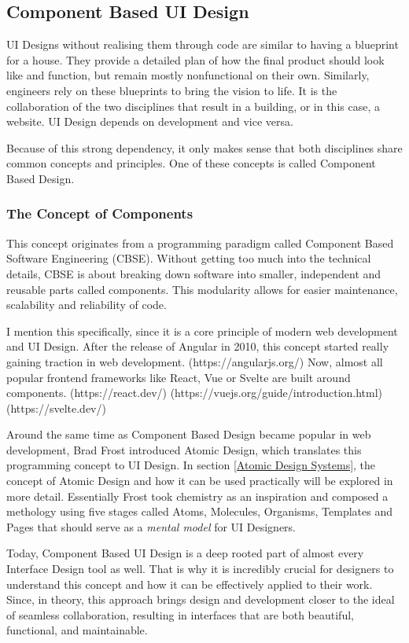 \newpage
\subsection{Component Based UI Design}
UI Designs without realising them through code are similar to having a blueprint for a house. They
provide a detailed plan of how the final product should look like and function, but remain mostly
nonfunctional on their own. Similarly, engineers rely on these blueprints to bring the vision to
life. It is the collaboration of the two disciplines that result in a building, or in this case, a
website. UI Design depends on development and vice versa. 

Because of this strong dependency, it only makes sense that both disciplines share common concepts
and principles. One of these concepts is called Component Based Design.

\subsubsection{The Concept of Components}
This concept originates from a programming paradigm called Component Based Software Engineering
(CBSE). Without getting too much into the technical details, CBSE is about breaking down software
into smaller, independent and reusable parts called components. This modularity allows for easier
maintenance, scalability and reliability of code.

I mention this specifically, since it is a core principle of modern web development and UI Design.
After the release of Angular in 2010, this concept started really gaining traction in web development.
(https://angularjs.org/)
Now, almost all popular frontend frameworks like React, Vue or Svelte are built around components.
(https://react.dev/) (https://vuejs.org/guide/introduction.html) (https://svelte.dev/)

Around the same time as Component Based Design became popular in web development, Brad Frost
introduced Atomic Design, which translates this programming concept to UI Design. In section
\ref{Atomic Design Systems}, the concept of Atomic Design and how it can be used practically will be
explored in more detail. Essentially Frost took chemistry as an inspiration and composed a methology
using five stages called Atoms, Molecules, Organisms, Templates and Pages that should serve as a
\textit{mental model} for UI Designers. 

Today, Component Based UI Design is a deep rooted part of almost every Interface Design tool as
well. That is why it is incredibly crucial for designers to understand this concept and how it can
be effectively applied to their work. Since, in theory, this approach brings design and development
closer to the ideal of seamless collaboration, resulting in interfaces that are both beautiful,
functional, and maintainable.